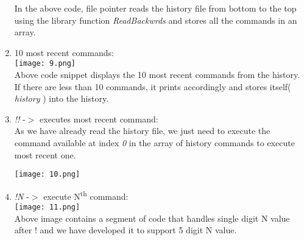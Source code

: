 \documentclass[12pt,twoside]{article}
\begin{document}
\begin{enumerate}
In the above code, file pointer reads the history file from bottom to the top using the library function \emph{ReadBackwrds} and stores all the commands in an array.

    \item 10 most recent commands:\\
\hfill \break
\texttt{[image: 9.png]}\\
\hfill \break
Above code snippet displays the 10 most recent commands from the history. If there are less than 10 commands, it prints accordingly and stores itself( \emph{history} ) into the history.\\

    \item \emph{!!} -$>$ executes most recent command:\\
As we have already read the history file, we just need to execute the command available at index \emph{0} in the array of history commands to execute most recent one.\\
\hfill \break
\hfill \break
\hfill \break
\hfill \break
\hfill \break
\hfill \break
\hfill \break

\texttt{[image: 10.png]}\\

    \item \emph{!N} -$>$ execute N\textsuperscript{th} command:\\
\hfill \break
\texttt{[image: 11.png]}\\
\hfill \break
Above image contains a segment of code that handles single digit N value after ! and we have developed it to support 5 digit N value.\\
\hfill \break
\hfill \break
\hfill \break
\hfill \break



\end{enumerate}
\end{document}

